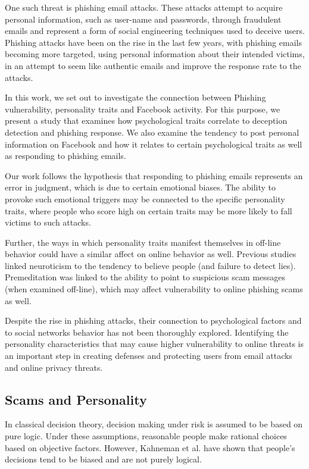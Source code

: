 \documentclass{sig-alternate}
\begin{document}
One such threat is phishing email attacks. These attacks
attempt to acquire personal information, such as user-name and passwords, through fraudulent emails and represent a form of social engineering techniques used to deceive users. Phishing attacks have been on the rise in the last few years, with phishing emails becoming more targeted, using personal information about their intended victims, in an attempt to seem like authentic emails and improve the response rate to the attacks.


In this work, we set out to investigate the connection between Phishing vulnerability, personality traits and Facebook activity. For this purpose, we present a study that examines how psychological traits correlate to deception detection and phishing response. 
We also examine the tendency to post personal information on Facebook and how it relates to certain psychological traits as well as responding to phishing emails.

Our work follows the hypothesis that responding to phishing emails represents an error in judgment, which is due to certain emotional biases. The ability to provoke such emotional triggers may be connected to the specific personality traits, where people who score high on certain traits may be more likely to fall victims to such attacks. 

Further, the ways in which personality traits manifest themselves in off-line behavior could have a similar affect on online behavior as well. Previous studies linked neuroticism to the tendency to believe people (and failure to detect lies).
Premeditation was linked to the
ability to point to suspicious scam messages (when examined off-line), which may affect vulnerability to online phishing scams as well.

Despite the rise in phishing attacks, their connection to psychological factors and to social networks behavior has not been thoroughly explored. Identifying the personality 
characteristics that may cause higher vulnerability to online threats is an important step in creating defenses and protecting users from email attacks and online privacy threats. 


\subsection{Scams and Personality}
In classical decision theory, decision making under risk is assumed to be based on pure logic. Under these assumptions, reasonable people make rational choices based on objective factors. However, Kahneman et al. \cite{KT79} have shown that people's decisions tend to be biased and are not purely logical.
\end{document}
